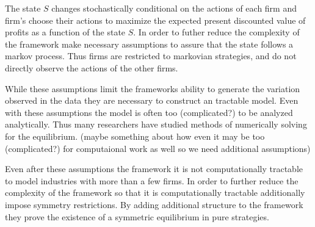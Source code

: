 \documentclass[12pt]{article}
\begin{document}
The state $S$ changes stochastically conditional on the actions of each firm and firm's choose their actions to maximize the expected present discounted value of profits as a function of the state $S$. In order to futher reduce the complexity of the framework \citet{1995_Erickson_Pakes_RES} make necessary assumptions to assure that the state follows a markov process. Thus firms are restricted to markovian strategies, and do not directly observe the actions of the other firms.


While these assumptions limit the frameworks ability to generate the variation observed in the data they are necessary to construct an tractable model. Even with these assumptions the model is often too (complicated?) to be analyzed analytically. Thus many researchers have studied methods of numerically solving for the equilibrium. (maybe something about how even it may be too (complicated?) for computaional work as well so we need additional assumptions)

Even after these assumptions the framework it is not computationally tractable to model industries with more than a few firms.
In order to further reduce the complexity of the framework so that it is computationally tractable \citet{2010_Doraszelski_Satterthwaite_RAND} additionally impose symmetry restrictions. By adding additional structure to the framework they prove the existence of a symmetric equilibrium in pure strategies.
\end{document}
